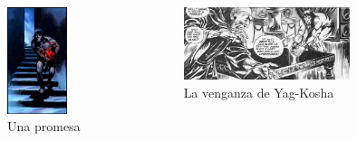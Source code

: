 \begin{frame}{}
\begin{columns}
    \begin{figure}[htb]
    \centering
        \includegraphics[width=0.7\textwidth]{img/res/19}
        \caption{Una promesa}
    \end{figure}
    \begin{figure}[htb]
    \centering
        \includegraphics[width=0.8\textwidth]{img/res/20}
        \caption{La venganza de Yag-Kosha}
    \end{figure}
\end{columns}
\end{frame}

